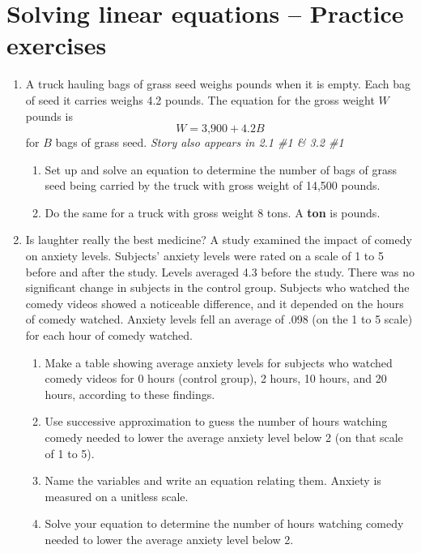 
\section{Solving linear equations -- Practice exercises}

\begin{enumerate}

\item A truck hauling bags of grass seed weighs  pounds when it is empty.  Each bag of seed it carries weighs 4.2 pounds.   The equation for the gross weight $W$ pounds is $$W = \text{3,900} + 4.2B$$ for $B$ bags of grass seed.  \hfill \emph{Story also appears in 2.1 \#1 \& 3.2 \#1}
\begin{enumerate} 
\item Set up and solve an equation to determine the number of bags of grass seed being carried by the truck with gross weight of 14,500 pounds. \vfill
\item Do the same for a truck with gross weight 8 tons. A \textbf{ton} is  pounds. \vfill \vfill
\end{enumerate} 

\newpage %

\item Is laughter really the best medicine?  A study examined the impact of comedy on anxiety levels.  Subjects' anxiety levels were rated on a scale of 1 to 5 before and after the study.  Levels averaged 4.3 before the study.  There was no significant change in subjects in the control group.  Subjects who watched the comedy videos showed a noticeable difference, and it depended on the hours of comedy watched.  Anxiety levels fell an average of .098 (on the 1 to 5 scale) for each hour of comedy watched.
\begin{enumerate}
\item Make a table showing average anxiety levels for subjects who watched comedy videos for 0 hours (control group), 2 hours, 10 hours, and 20 hours, according to these findings.  \vfill
\item Use successive approximation to guess the number of hours watching comedy needed to lower the average anxiety level below 2 (on that scale of 1 to 5). \vfill
\item Name the variables and write an equation relating them.  Anxiety is measured on a unitless scale. \vfill
\item Solve your equation to determine the number of hours watching comedy needed to lower the average anxiety level below 2. \vfill
\end{enumerate}


\end{enumerate}
